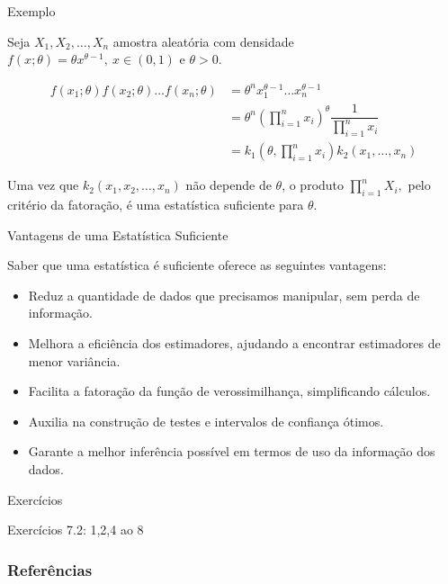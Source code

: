 \documentclass[12pt]{beamer}
\begin{document}
\begin{frame}{Exemplo}
\begin{block}{}
\justifying
Seja $X_1, X_2, \ldots, X_n$ amostra aleatória com densidade 
$f(x; \theta) =\theta x^{\theta-1},~x\in (0,1)$ e $\theta>0.$

\begin{align*}
f(x_{1}; \theta) f(x_{2}; \theta) \ldots f(x_{n}; \theta)&=\theta^{n}x_{1}^{\theta-1} \ldots x_{n}^{\theta-1}\\
&=\theta^{n}\left(\displaystyle{\prod_{i=1}^{n}} x_i\right)^{\theta}\dfrac{1}{\displaystyle{\prod_{i=1}^{n}} x_i}\\
&=k_{1}(\theta,\displaystyle{\prod_{i=1}^{n}} x_i)k_{2}(x_{1},\ldots, x_{n})
\end{align*}

Uma vez que $k_2(x_1, x_2, \ldots, x_n)$ não depende de $\theta$, o produto $\prod_{i=1}^n X_i,$ pelo critério da fatoração, é uma estatística suficiente para $\theta$.
\end{block}
\end{frame}

\begin{frame}{Vantagens de uma Estatística Suficiente}
	\begin{block}{Saber que uma estatística é suficiente oferece as seguintes vantagens:}
		\justifying
	\begin{itemize}
		\item Reduz a quantidade de dados que precisamos manipular, sem perda de informação.\pause
		\item Melhora a eficiência dos estimadores, ajudando a encontrar estimadores de menor variância.\pause
		\item Facilita a fatoração da função de verossimilhança, simplificando cálculos.\pause
		\item Auxilia na construção de testes e intervalos de confiança ótimos.\pause
		\item Garante a melhor inferência possível em termos de uso da informação dos dados.
	\end{itemize}
	\end{block}
\end{frame}

\begin{frame}{Exercícios}
\begin{block}{\Home}
\justifying
Exercícios 7.2: 1,2,4 ao 8
\nocite{hogg, casella2021statistical, bolfarine}
\end{block}
\end{frame}

\begin{frame}[allowframebreaks]
\frametitle{\bf Referências}
\printbibliography
\end{frame}
\end{document}
